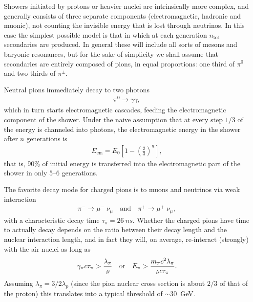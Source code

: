 Showers initiated by protons or heavier nuclei are intrinsically more complex,
and generally consists of three separate components (electromagnetic, hadronic
and muonic), not counting the invisible energy that is lost through neutrinos.
In this case the simplest possible model is that in which at each generation
$n_\text{tot}$ secondaries
are produced. In general these will include all sorts
of mesons and baryonic resonances, but for the sake of simplicity we shall assume
that secondaries are entirely composed of pions, in equal proportions: one third
of $\pi^0$ and two thirds of $\pi^\pm$.

Neutral pions immediately decay to two photons
\begin{align*}
  \pi^0 \rightarrow \gamma \gamma,
\end{align*}
which in turn starts electromagnetic cascades, feeding the electromagnetic component
of the shower. Under the naive assumption that at every step $1/3$ of the energy
is channeled into photons, the electromagnetic energy in the shower after $n$
generations is
\begin{align}
  E_\text{em} = E_0 \left[ 1 - \left( \frac{2}{3} \right)^n \right],
\end{align}
that is, 90\% of initial energy is transferred into the electromagnetic part of the
shower in only 5--6 generations.

The favorite decay mode for charged pions is to muons and neutrinos via weak interaction
\begin{align*}
  \pi^- \rightarrow \mu^- \; \overline{\nu}_\mu
  \quad\text{and}\quad
  \pi^+ \rightarrow \mu^+ \; \nu_\mu,
\end{align*}
with a characteristic decay time $\tau_\pi = 26~ns$. Whether the charged pions
have time to actually decay depends on the ratio between their decay length and
the nuclear interaction length, and in fact they will, on average, re-interact
(strongly) with the air nuclei as long as
\begin{align*}
  \gamma_\pi c \tau_\pi > \frac{\lambda_\pi}{\varrho}
  \quad\text{or}\quad
  E_\pi > \frac{m_\pi c^2 \lambda_\pi}{\varrho c\tau_\pi}.
\end{align*}
Assuming $\lambda_\pi = 3/2 \lambda_p$ (since the pion nuclear cross section is
about $2/3$ of that of the proton) this translates into a typical threshold of
$\sim 30$~GeV.

